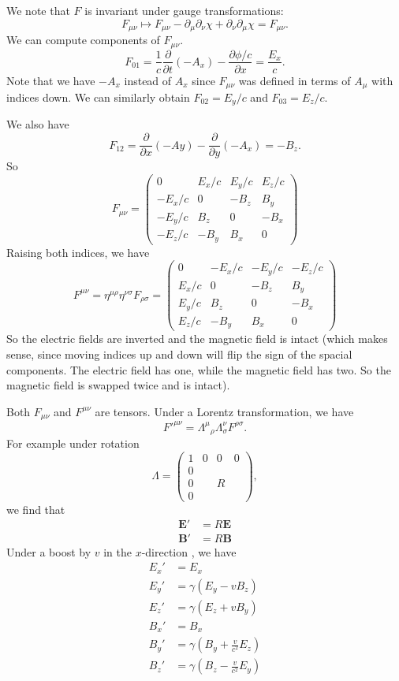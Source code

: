 \documentclass[a4paper]{article}
\begin{document}
We note that $F$ is invariant under gauge transformations:
\[
  F_{\mu\nu} \mapsto F_{\mu\nu} - \partial_\mu\partial_\nu\chi + \partial_\nu\partial_\mu \chi = F_{\mu\nu}.
\]
We can compute components of $F_{\mu\nu}$.
\[
  F_{01} = \frac{1}{c}\frac{\partial}{\partial t}(-A_x) - \frac{\partial \phi/c}{\partial x} = \frac{E_x}{c}.
\]
Note that we have $-A_x$ instead of $A_x$ since $F_{\mu\nu}$ was defined in terms of $A_\mu$ with indices down. We can similarly obtain $F_{02} = E_y/c$ and $F_{03} = E_z/c$.

We also have
\[
  F_{12} = \frac{\partial}{\partial x}(-Ay) - \frac{\partial}{\partial y}(-A_x) = -B_z.
\]
So
\[
  F_{\mu\nu} =
  \begin{pmatrix}
    0 & E_x/c & E_y/c & E_z/c\\
    -E_x/c & 0 & -B_z & B_y\\
    -E_y/c & B_z & 0 & -B_x\\
    -E_z/c & -B_y & B_x & 0
  \end{pmatrix}
\]
Raising both indices, we have
\[
  F^{\mu\nu} = \eta^{\mu\rho}\eta^{\nu\sigma} F_{\rho\sigma} =
  \begin{pmatrix}
    0 & -E_x/c & -E_y/c & -E_z/c\\
    E_x/c & 0 & -B_z & B_y\\
    E_y/c & B_z & 0 & -B_x\\
    E_z/c & -B_y & B_x & 0
  \end{pmatrix}
\]
So the electric fields are inverted and the magnetic field is intact (which makes sense, since moving indices up and down will flip the sign of the spacial components. The electric field has one, while the magnetic field has two. So the magnetic field is swapped twice and is intact).

Both $F_{\mu\nu}$ and $F^{\mu\nu}$ are tensors. Under a Lorentz transformation, we have
\[
  F'^{\mu\nu} = \Lambda^\mu\!_\rho\Lambda^\nu_\sigma F^{\rho\sigma}.
\]
For example under rotation
\[
  \Lambda =
  \begin{pmatrix}
    1 & 0 & 0 & 0\\
    0\\
    0 & & R\\
    0
  \end{pmatrix},
\]
we find that
\begin{align*}
  \mathbf{E}' &= R\mathbf{E}\\
  \mathbf{B}' &= R\mathbf{B}
\end{align*}
Under a boost by $v$ in the $x$-direction , we have
\begin{align*}
  E_x' &= E_x\\
  E_y' &= \gamma(E_y - vB_z)\\
  E_z' &= \gamma(E_z + vB_y)\\
  B_x' &= B_x\\
  B_y' &= \gamma\left(B_y + \frac{v}{c^2}E_z\right)\\
  B_z' &= \gamma\left(B_z - \frac{v}{c^2} E_y\right)
\end{align*}
\end{document}
